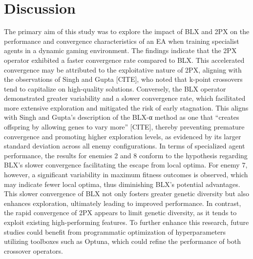 \section{Discussion}
The primary aim of this study was to explore the impact of BLX and 2PX on the performance and convergence characteristics of an EA when training specialist agents in a dynamic gaming environment.
The findings indicate that the 2PX operator exhibited a faster convergence rate compared to BLX.
This accelerated convergence may be attributed to the exploitative nature of 2PX, aligning with the observations of Singh and Gupta [CITE], who noted that k-point crossovers tend to capitalize on high-quality solutions.
Conversely, the BLX operator demonstrated greater variability and a slower convergence rate, which facilitated more extensive exploration and mitigated the risk of early stagnation.
This aligns with Singh and Gupta’s description of the BLX-α method as one that “creates offspring by allowing genes to vary more” [CITE], thereby preventing premature convergence and promoting higher exploration levels, as evidenced by its larger standard deviation across all enemy configurations.
In terms of specialized agent performance, the results for enemies 2 and 8 conform to the hypothesis regarding BLX's slower convergence facilitating the escape from local optima.
For enemy 7, however, a significant variability in maximum fitness outcomes is observed, which may indicate fewer local optima, thus diminishing BLX's potential advantages.
This slower convergence of BLX not only fosters greater genetic diversity but also enhances exploration, ultimately leading to improved performance.
In contrast, the rapid convergence of 2PX appears to limit genetic diversity, as it tends to exploit existing high-performing features.
To further enhance this research, future studies could benefit from programmatic optimization of hyperparameters utilizing toolboxes such as Optuna, which could refine the performance of both crossover operators.




